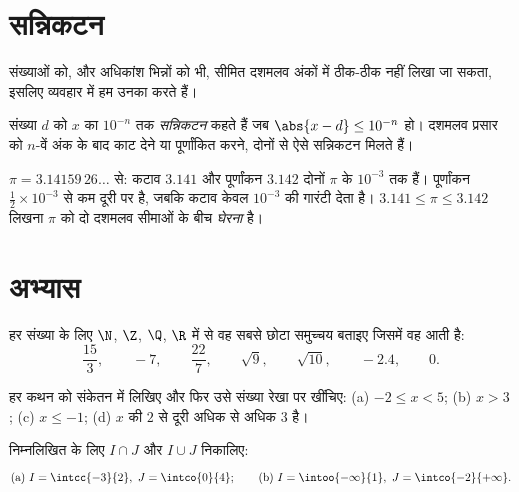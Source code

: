 \section{सन्निकटन}

 संख्याओं को, और अधिकांश भिन्नों को भी, सीमित दशमलव अंकों में ठीक-ठीक
नहीं लिखा जा सकता, इसलिए व्यवहार में हम उनका  करते हैं।

\begin{definition}[दी हुई यथार्थता तक सन्निकटन]\label{def:g10:numbers:approx}
संख्या $d$ को $x$ का $10^{-n}$ तक \emph{सन्निकटन} कहते
हैं जब $\abs{x - d} \leq 10^{-n}$ हो। दशमलव प्रसार को $n$-वें अंक के बाद काट देने या पूर्णांकित
करने, दोनों से ऐसे सन्निकटन मिलते हैं।
\end{definition}

\begin{example}
$\pi = 3.14159\,26\dots$ से: कटाव $3.141$ और पूर्णांकन $3.142$ दोनों $\pi$ के $10^{-3}$ तक 
हैं। पूर्णांकन $\frac12 \times 10^{-3}$ से कम दूरी पर है, जबकि कटाव केवल $10^{-3}$ की गारंटी देता
है। $3.141 \leq \pi \leq 3.142$ लिखना $\pi$ को दो दशमलव सीमाओं के बीच \emph{घेरना} है।
\end{example}

\section{अभ्यास}

\begin{exercise}[$\star$]\label{exo:g10:numbers:1}
हर संख्या के लिए $\N$, $\Z$, $\Q$, $\R$ में से वह सबसे छोटा समुच्चय
बताइए जिसमें वह आती है:
\[
\frac{15}{3}, \qquad -7, \qquad \frac{22}{7}, \qquad \sqrt{9}, \qquad
\sqrt{10}, \qquad -2.4, \qquad 0 .
\]
\end{exercise}

\begin{exercise}[$\star$]\label{exo:g10:numbers:2}
हर कथन को  संकेतन में लिखिए और फिर उसे संख्या रेखा पर खींचिए:
(a) $-2 \leq x < 5$; (b) $x > 3$; (c) $x \leq -1$;
(d) $x$ की $2$ से दूरी अधिक से अधिक $3$ है।
\end{exercise}

\begin{exercise}[$\star$]\label{exo:g10:numbers:3}
निम्नलिखित के लिए $I \cap J$ और $I \cup J$ निकालिए:
\[
\text{(a) } I = \intcc{-3}{2},\ J = \intco{0}{4};
\qquad
\text{(b) } I = \intoo{-\infty}{1},\ J = \intco{-2}{+\infty}.
\]
\end{exercise}

